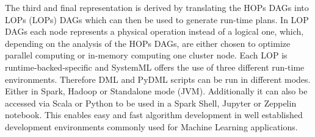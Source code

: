 The third and final representation is derived by translating the \acs{HOP}s \acs{DAG}s into \acl{LOP}s (\acs{LOP}s) \acs{DAG}s which can then be used to generate run-time plans. In \acs{LOP} \acs{DAG}s each node represents a physical operation instead of a logical one, which, depending on the analysis of the \acs{HOP}s \acs{DAG}s, are either chosen to optimize parallel computing or in-memory computing one cluster node.
Each \acl{LOP} is runtime-backed-specific and SystemML offers the use of three different run-time environments. Therefore \acs{DML} and PyDML scripts can be run in different modes. Either in Spark, Hadoop or Standalone mode (\acs{JVM}). Additionally it can also be accessed via Scala or Python to be used in a Spark Shell, Jupyter or Zeppelin notebook. This enables easy and fast algorithm development in well established development environments commonly used for Machine Learning applications.\textsuperscript{\cite[p.~54-56]{Boehm2014SystemMLsPrograms}}


